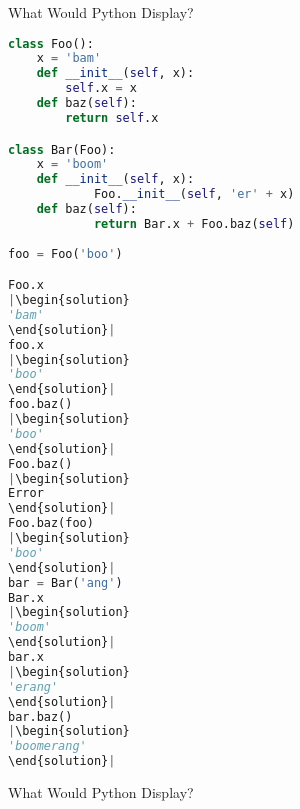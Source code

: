 \question
What Would Python Display?

\begin{lstlisting}[language=Python]
class Foo():
    x = 'bam'
    def __init__(self, x):
       	self.x = x
    def baz(self):
       	return self.x

class Bar(Foo):
  	x = 'boom'
   	def __init__(self, x):
       		Foo.__init__(self, 'er' + x) 
   	def baz(self):
       		return Bar.x + Foo.baz(self)
   
foo = Foo('boo')

Foo.x
|\begin{solution}
'bam'
\end{solution}|
foo.x
|\begin{solution}
'boo'
\end{solution}|
foo.baz()
|\begin{solution}
'boo'
\end{solution}|
Foo.baz()
|\begin{solution}
Error
\end{solution}|
Foo.baz(foo)
|\begin{solution}
'boo'
\end{solution}|
bar = Bar('ang')
Bar.x
|\begin{solution}
'boom'
\end{solution}|
bar.x
|\begin{solution}
'erang'
\end{solution}|
bar.baz()
|\begin{solution}
'boomerang'
\end{solution}|
\end{lstlisting}

\question 
What Would Python Display?

